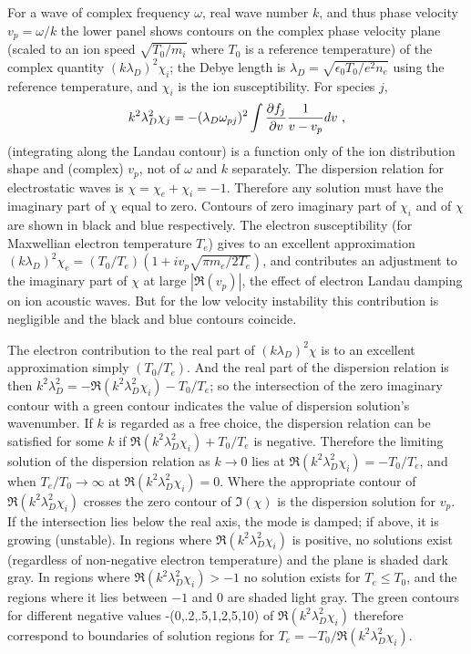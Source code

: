 \documentclass[12pt]{article}
\begin{document}
For a wave of complex frequency $\omega$, real wave
number $k$, and thus phase velocity $v_{p}=\omega/k$ the lower panel
shows contours on the complex phase velocity plane (scaled to an ion
speed $\sqrt{T_0/m_i}$ where $T_0$ is a reference temperature) of the
complex quantity $(k\lambda_D)^2\chi_i$; the Debye length is
$\lambda_D=\sqrt{\epsilon_0T_0/e^2n_e}$ using the reference
temperature, and $\chi_i$ is the ion susceptibility. For species $j$,
\begin{equation}\label{ionint}
  k^2\lambda_{D}^2 \chi_j = - (\lambda_D\omega_{pj})^2 \int  {\partial
    f_j\over \partial v } {1\over v- v_p} dv\ ,
\end{equation}
(integrating along the Landau contour) is a function only of the ion
distribution shape and (complex) $v_{p}$, not of $\omega$ and $k$
separately. The dispersion relation for electrostatic waves is
$\chi=\chi_e+\chi_i=-1$. Therefore any solution must have the
imaginary part of $\chi$ equal to zero. Contours of zero imaginary
part of $\chi_i$ and of $\chi$ are shown in black and blue
respectively. The electron susceptibility (for Maxwellian electron
temperature $T_e$) gives to an excellent approximation
$(k\lambda_D)^2\chi_e =(T_0/T_e)(1+iv_{p}\sqrt{\pi m_e/2T_e})$, and
contributes an adjustment to the imaginary part of $\chi$ at large
$|\Re(v_{p})|$, the effect of electron Landau damping on ion acoustic
waves. But for the low velocity instability this contribution is
negligible and the black and blue contours coincide.

The electron contribution to the real part of $(k\lambda_D)^2\chi$ is
to an excellent approximation simply $(T_0/T_e)$. And the real part of
the dispersion relation is then
$k^2\lambda_D^2 = -\Re(k^2\lambda_D^2\chi_i )-T_0/T_e$; so the
intersection of the zero imaginary contour with a green contour
indicates the value of dispersion solution's wavenumber. If $k$ is
regarded as a free choice, the dispersion relation can be satisfied
for some $k$ if $\Re(k^2\lambda_D^2\chi_i )+T_0/T_e$ is
negative. Therefore the limiting solution of the dispersion relation
as $k\to 0$ lies at $\Re(k^2\lambda_D^2\chi_i )=-T_0/T_e$, and when
$T_e/T_0\to \infty$ at $\Re(k^2\lambda_D^2\chi_i)=0$. Where the
appropriate contour of $\Re(k^2\lambda_D^2\chi_i)$ crosses the zero
contour of $\Im(\chi)$ is the dispersion solution for $v_{p}$. If the
intersection lies below the real axis, the mode is damped; if above,
it is growing (unstable). In regions where $\Re(k^2\lambda_D^2\chi_i)$
is positive, no solutions exist (regardless of non-negative electron
temperature) and the plane is shaded dark gray. In regions where
$\Re(k^2\lambda_D^2\chi_i)>-1$ no solution exists for $T_e\le T_0$,
and the regions where it lies between $-1$ and $0$ are shaded light
gray. The green contours for different negative values
-(0,.2,.5,1,2,5,10) of
$\Re(k^2\lambda_D^2\chi_i)$ therefore correspond to boundaries of
solution regions for $T_e=-T_0/\Re(k^2\lambda_D^2\chi_i)$.
\end{document}
